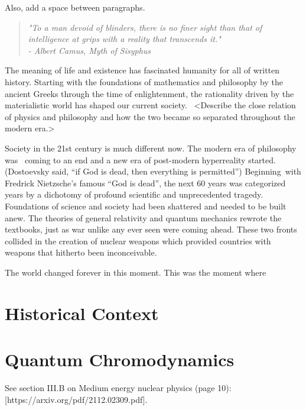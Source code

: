\documentclass[
]{report}
\begin{document}
Also, add a space between paragraphs.
\label{Chapter-2}

\begin{quote}
\centering \emph{"To a man devoid of blinders, there is no finer sight than that of intelligence at grips with a reality that transcends it."}\\
\centering \emph{- Albert Camus, Myth of Sisyphus}
\end{quote}

\hfill

The meaning of life and existence has fascinated humanity for all of
written history. Starting with the foundations of mathematics and
philosophy by the ancient Greeks through the time of enlightenment, the
rationality driven by the materialistic world has shaped our current
society.~ \textless Describe the close relation of physics and
philosophy and how the two became so separated throughout the modern
era.\textgreater{}

Society in the 21st century is much different now. The modern era of
philosophy was~ coming to an end and a new era of post-modern
hyperreality started. (Dostoevsky said, ``if God is dead, then
everything is permitted'') Beginning~with Fredrick Nietzsche's famous
``God is dead'', the next 60 years was categorized years by a dichotomy
of profound scientific and unprecedented tragedy. Foundations of science
and society had been shattered and needed to be built anew. The theories
of general relativity and quantum mechanics rewrote the textbooks, just
as war unlike any ever seen were coming ahead. These two fronts collided
in the creation of nuclear weapons which provided countries with weapons
that hitherto been inconceivable.

The world changed forever in this moment. This was the moment where

\hypertarget{Section-2.1}{%
\section{Historical Context}\label{Section-2.1}}

\label{Chapter-3}

\hypertarget{Section-3.1}{%
\section{Quantum Chromodynamics}\label{Section-3.1}}

See section III.B on Medium energy nuclear physics (page 10):
{[}https://arxiv.org/pdf/2112.02309.pdf{]}.
\end{document}
